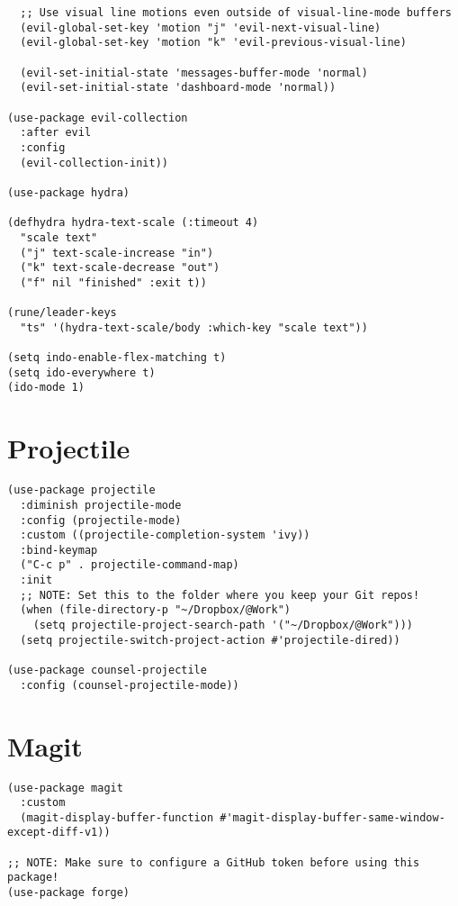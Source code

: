 \documentclass[11pt]{article}
\begin{document}
\begin{verbatim}
  ;; Use visual line motions even outside of visual-line-mode buffers
  (evil-global-set-key 'motion "j" 'evil-next-visual-line)
  (evil-global-set-key 'motion "k" 'evil-previous-visual-line)

  (evil-set-initial-state 'messages-buffer-mode 'normal)
  (evil-set-initial-state 'dashboard-mode 'normal))

(use-package evil-collection
  :after evil
  :config
  (evil-collection-init))

(use-package hydra)

(defhydra hydra-text-scale (:timeout 4)
  "scale text"
  ("j" text-scale-increase "in")
  ("k" text-scale-decrease "out")
  ("f" nil "finished" :exit t))

(rune/leader-keys
  "ts" '(hydra-text-scale/body :which-key "scale text"))

(setq indo-enable-flex-matching t)
(setq ido-everywhere t)
(ido-mode 1)

\end{verbatim}

\section{Projectile}
\label{sec:orge3ea0ca}
\begin{verbatim}
(use-package projectile
  :diminish projectile-mode
  :config (projectile-mode)
  :custom ((projectile-completion-system 'ivy))
  :bind-keymap
  ("C-c p" . projectile-command-map)
  :init
  ;; NOTE: Set this to the folder where you keep your Git repos!
  (when (file-directory-p "~/Dropbox/@Work")
    (setq projectile-project-search-path '("~/Dropbox/@Work")))
  (setq projectile-switch-project-action #'projectile-dired))

(use-package counsel-projectile
  :config (counsel-projectile-mode))

\end{verbatim}

\section{Magit}
\label{sec:org134c04d}
\begin{verbatim}
(use-package magit
  :custom
  (magit-display-buffer-function #'magit-display-buffer-same-window-except-diff-v1))

;; NOTE: Make sure to configure a GitHub token before using this package!
(use-package forge)

\end{verbatim}
\end{document}
